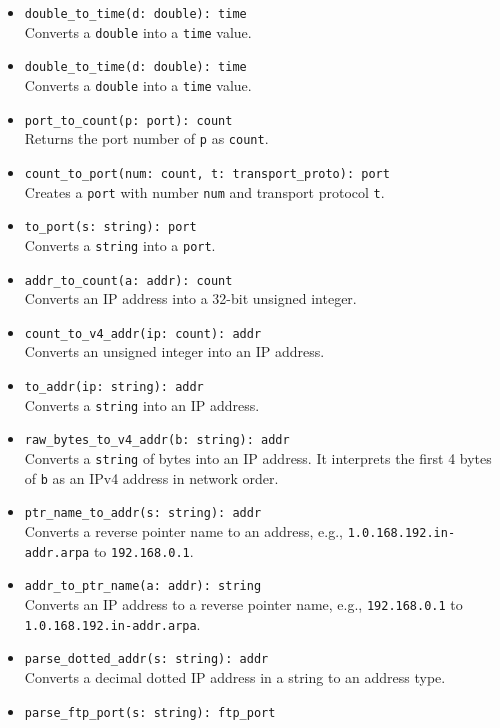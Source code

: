 \documentclass[10pt,landscape]{article}
\begin{document}
\begin{multicols*}{2}
\begin{itemize}
  \item \verb|double_to_time(d: double): time|\\
    Converts a \texttt{double} into a \texttt{time} value.
  \item \verb|double_to_time(d: double): time|\\
    Converts a \texttt{double} into a \texttt{time} value.
  \item \verb|port_to_count(p: port): count|\\
    Returns the port number of \texttt{p} as \texttt{count}.
  \item \verb|count_to_port(num: count, t: transport_proto): port|\\
    Creates a \texttt{port} with number \texttt{num} and transport protocol
    \texttt{t}.
  \item \verb|to_port(s: string): port|\\
    Converts a \texttt{string} into a \texttt{port}.
  \item \verb|addr_to_count(a: addr): count|\\
    Converts an IP address into a 32-bit unsigned integer.
  \item \verb|count_to_v4_addr(ip: count): addr|\\
    Converts an unsigned integer into an IP address.
  \item \verb|to_addr(ip: string): addr|\\
    Converts a \texttt{string} into an IP address.
  \item \verb|raw_bytes_to_v4_addr(b: string): addr|\\
    Converts a \texttt{string} of bytes into an IP address. It interprets the
    first 4 bytes of \texttt{b} as an IPv4 address in network order.
  \item \verb|ptr_name_to_addr(s: string): addr|\\
    Converts a reverse pointer name to an address, e.g.,
    \verb|1.0.168.192.in-addr.arpa| to \verb|192.168.0.1|.
  \item \verb|addr_to_ptr_name(a: addr): string|\\
    Converts an IP address to a reverse pointer name, e.g.,
    \verb|192.168.0.1| to \verb|1.0.168.192.in-addr.arpa|.
  \item \verb|parse_dotted_addr(s: string): addr|\\
    Converts a decimal dotted IP address in a string to an address type.
  \item \verb|parse_ftp_port(s: string): ftp_port|\\

\end{itemize}
\end{multicols*}
\end{document}
